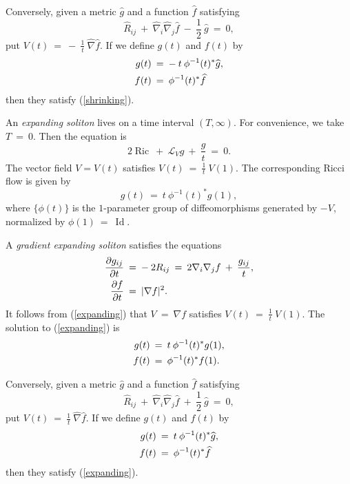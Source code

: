 \documentclass[12pt]{amsart}
\newcommand{\Id}{\operatorname{Id}}
\newcommand{\Ric}{\operatorname{Ric}}
\numberwithin{equation}{section}
\theoremstyle{plain}
\theoremstyle{definition}
\theoremstyle{remark}
\begin{document}
Conversely, given a metric $\widehat{g}$ and a function $\widehat{f}$
satisfying 
\begin{equation}
\widehat{R}_{ij} \: + \: \widehat{\nabla}_i \widehat{\nabla}_j \widehat{f} 
\: - \: \frac{1}{2} \:
\widehat{g}
\: = \: 0,
\end{equation}
put $V(t) \: = \: - \: \frac{1}{t} \: \widehat{\nabla} \widehat{f}$. 
If we define $g(t)$ and $f(t)$ by 
\begin{align}
g(t) \: & = \: - \: t \: \phi^{-1}(t)^* \widehat{g}, \\
f(t) \: & = \: \phi^{-1}(t)^* \widehat{f} \notag
\end{align}
then they satisfy (\ref{shrinking}). 

An {\em expanding soliton} lives on a time interval $(T, \infty)$.
For convenience, we take $T \: = \: 0$. Then the equation is
\begin{equation}
2\Ric \: + \: {\mathcal L}_V g \: + \: \frac{g}{t} \: = \: 0.
\end{equation}
The vector field $V = V(t)$ satisfies
$V(t) \: = \: \frac{1}{t} \: V(1)$.
The corresponding Ricci flow is given by
\begin{equation}
g(t) \: = \: t \: \phi^{-1}(t)^* g(1),
\end{equation}
where $\{ \phi(t) \}$ is the $1$-parameter group of diffeomorphisms generated 
by $- V$, normalized by $\phi(1) \: = \: \Id$.

A {\em gradient expanding soliton} satisfies the equations
\begin{align} \label{expanding}
\frac{\partial g_{ij}}{\partial t} \: & = \: - \: 2 R_{ij} \: = \:
2 \nabla_i \nabla_j f \: + \: \frac{g_{ij}}{t}, \\
\frac{\partial f}{\partial t} \: & = \: |\nabla f|^2. \notag
\end{align}
It follows from (\ref{expanding}) that
$V \: = \: \nabla f$ satisfies $V(t) \: = \: \frac{1}{t} \: V(1)$.
The solution to (\ref{expanding}) is
\begin{align} \label{expandingsoln}
g(t) \: & = \: t \: \phi^{-1}(t)^* g(1), \\
f(t) \: & = \: \phi^{-1}(t)^* f(1). \notag
\end{align}

Conversely, given a metric $\widehat{g}$ and a function $\widehat{f}$
satisfying 
\begin{equation}
\widehat{R}_{ij} \: + \: \widehat{\nabla}_i \widehat{\nabla}_j \widehat{f} 
\: + \: \frac{1}{2} \:
\widehat{g}
\: = \: 0,
\end{equation}
put $V(t) \: = \: \frac{1}{t} \: \widehat{\nabla} \widehat{f}$. 
If we define $g(t)$ and $f(t)$ by 
\begin{align}
g(t) \: & = \: t \: \phi^{-1}(t)^* \widehat{g}, \\
f(t) \: & = \: \phi^{-1}(t)^* \widehat{f} \notag
\end{align}
then they satisfy (\ref{expanding}). 
\end{document}
